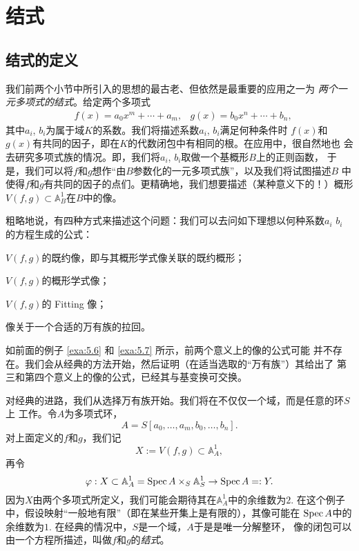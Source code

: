 \section{结式}\label{s:5.2}
\subsection{结式的定义}\label{s:5.2.1}
我们前两个小节中所引入的思想的最古老、但依然是最重要的应用之一为
\textit{两个一元多项式的结式}。给定两个多项式
\[
\begin{aligned}
    &f(x)=a_0x^m+\cdots+a_m,
    &g(x)=b_0x^n+\cdots+b_n,
\end{aligned}
\]
其中$a_i$, $b_i$为属于域$K$的系数。我们将描述系数$a_i$, $b_i$满足何种条件时
$f(x)$和$g(x)$有共同的因子，即在$K$的代数闭包中有相同的根。在应用中，很自然地也
会去研究多项式族的情况。即，我们将$a_i$, $b_i$取做一个基概形$B$上的正则函数，
于是，我们可以将$f$和$g$想作“由$B$参数化的一元多项式族”，以及我们将试图描述$B$
中使得$f$和$g$有共同的因子的点们。更精确地，我们想要描述（某种意义下的！）概形
$V(f,g)\subset \mathbb A_B^1$在$B$中的像。

粗略地说，有四种方式来描述这个问题：我们可以去问如下理想以何种系数$a_i$ $b_i$
的方程生成的公式：
\begin{compactenum}
\item $V(f,g)$的既约像，即与其概形学式像关联的既约概形；
\item $V(f,g)$的概形学式像；
\item $V(f,g)$的 Fitting 像；
\item 像关于一个合适的万有族的拉回。
\end{compactenum}

如前面的例子 \ref{exa:5.6} 和 \ref{exa:5.7} 所示，前两个意义上的像的公式可能
并不存在。我们会从经典的方法开始，然后证明（在适当选取的“万有族”）其给出了
第三和第四个意义上的像的公式，已经其与基变换可交换。

对经典的进路，我们从选择万有族开始。我们将在不仅仅一个域，而是任意的环$S$上
工作。令$A$为多项式环，
\[
    A=S[a_0,\dots,a_m,b_0,\dots,b_n].
\]
对上面定义的$f$和$g$，我们记
\[
    X:=V(f,g)\subset \mathbb A_A^1,
\]
再令
\[
    \varphi:X\subset \mathbb A_A^1=\operatorname{Spec} A\times_S \mathbb A_S^1
    \to \operatorname{Spec} A=:Y.
\]%
因为$X$由两个多项式所定义，我们可能会期待其在$\mathbb A_A^1$中的余维数为$2$.
在这个例子中，假设映射“一般地有限”（即在某些开集上是有限的），其像可能在
$\operatorname{Spec} A$中的余维数为$1$. 在经典的情况中，$S$是一个域，$A$于是是唯一分解整环，
像的闭包可以由一个方程所描述，叫做$f$和$g$的\textit{结式}。

